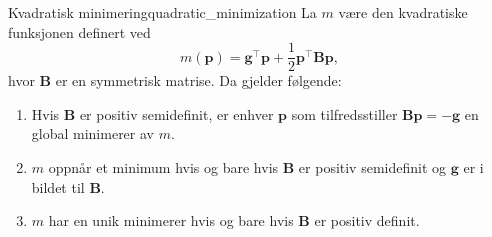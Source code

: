 \begin{lemma}{Kvadratisk minimering}{quadratic_minimization}
	La \(m\) være den kvadratiske funksjonen definert ved
	\[
		m(\symbf{p}) = \symbf{g}^\top \symbf{p} + \frac{1}{2} \symbf{p}^\top \symbf{B}\symbf{p},
	\]
	hvor \(\symbf{B}\) er en symmetrisk matrise. Da gjelder følgende:
	\begin{enumerate}
		\item Hvis \(\symbf{B}\) er positiv semidefinit, er enhver \(\symbf{p}\) som tilfredsstiller \(\symbf{B}\symbf{p} = -\symbf{g}\) en global minimerer av \(m\).
		\item \(m\) oppnår et minimum hvis og bare hvis \(\symbf{B}\) er positiv semidefinit og \(\symbf{g}\) er i bildet til \(\symbf{B}\).
		\item \(m\) har en unik minimerer hvis og bare hvis \(\symbf{B}\) er positiv definit.
	\end{enumerate}
\end{lemma}

